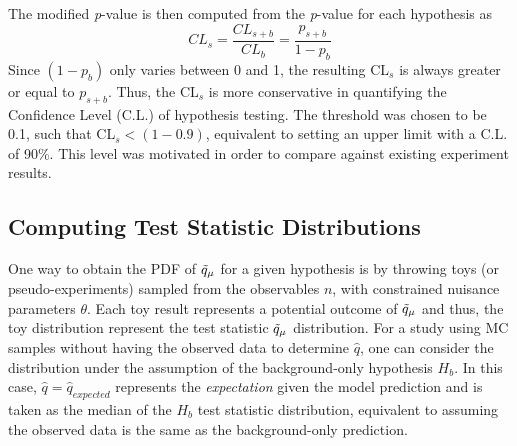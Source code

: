 The modified \textit{p}-value is then computed from the \textit{p}-value for each hypothesis as \cite{asymptotic_test, CLs_Junk, CLs_Read}
\begin{equation}
\label{eq:cls}
    CL_{s} = \frac{CL_{s+b}}{CL_b}= \frac{p_{s+b}}{1-p_b}
\end{equation}
Since $(1 - p_b)$ only varies between 0 and 1, the resulting CL$_s$ is always greater or equal to $p_{s+b}$.
Thus, the CL$_{s}$ is more conservative in quantifying the Confidence Level (C.L.) of hypothesis testing.
The threshold was chosen to be 0.1, such that CL$_{s} < (1 - 0.9)$, equivalent to setting an upper limit with a C.L. of 90\%.
This level was motivated in order to compare against existing experiment results. 

\subsection{Computing Test Statistic Distributions}
\label{sec:compute_test}

One way to obtain the PDF of $\Tilde{q}_\mu$ for a given hypothesis is by throwing toys (or pseudo-experiments) sampled from the observables $n$, with constrained nuisance parameters $\theta$. 
Each toy result represents a potential outcome of $\Tilde{q}_\mu$ and thus, the toy distribution represent the test statistic $\Tilde{q}_\mu$ distribution.
For a study using MC samples without having the observed data to determine $\hat{q}$, one can consider the distribution under the assumption of the background-only hypothesis $H_b$.
In this case, $\hat{q} = \hat{q}_{expected}$ represents the \textit{expectation} given the model prediction and is taken as the median of the $H_b$ test statistic distribution, equivalent to assuming the observed data is the same as the background-only prediction. 

